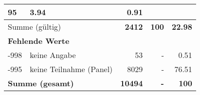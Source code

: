 \begin{longtable}{lXrrr}
       \num{95} &
       \num[round-mode=places,round-precision=2]{3,94} &
         \num[round-mode=places,round-precision=2]{0,91} \\
     \midrule
     \multicolumn{2}{l}{Summe (gültig)} &
       \textbf{\num{2412}} &
     \textbf{100} &
       \textbf{\num[round-mode=places,round-precision=2]{22,98}} \\
     \multicolumn{5}{l}{\textbf{Fehlende Werte}}\\
       -998 &
       keine Angabe &
         \num{53} &
        - &
         \num[round-mode=places,round-precision=2]{0,51} \\
       -995 &
       keine Teilnahme (Panel) &
         \num{8029} &
        - &
         \num[round-mode=places,round-precision=2]{76,51} \\
     \midrule
     \multicolumn{2}{l}{\textbf{Summe (gesamt)}} &
          \textbf{\num{10494}} &
        \textbf{-} &
        \textbf{100} \\
     \bottomrule
     \end{longtable}
     
